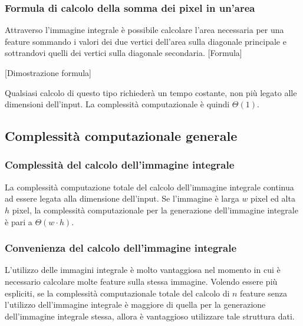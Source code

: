             \subsubsection{Formula di calcolo della somma dei pixel in un'area}
                Attraverso l'immagine integrale è possibile calcolare l'area necessaria per una feature sommando i valori dei due vertici dell'area sulla diagonale principale e sottrandovi quelli dei vertici sulla diagonale secondaria.
                [Formula]

                [Dimostrazione formula]

                Qualsiasi calcolo di questo tipo richiederà un tempo costante, non più legato alle dimensioni dell'input.
                La complessità computazionale è quindi $\Theta(1)$.

        \subsection{Complessità computazionale generale}
            \subsubsection{Complessità del calcolo dell'immagine integrale}
            La complessità computazione totale del calcolo dell'immagine integrale continua ad essere legata alla dimensione dell'input.
            Se l'immagine è larga $w$ pixel ed alta $h$ pixel, la complessità computazionale per la generazione dell'immagine integrale è pari a $\Theta(w \cdot h)$.

            \subsubsection{Convenienza del calcolo dell'immagine integrale}
            L'utilizzo delle immagini integrale è molto vantaggiosa nel momento in cui è necessario calcolare molte feature sulla stessa immagine.
            Volendo essere più espliciti, se la complessità computazionale totale del calcolo di $n$ feature senza l'utilizzo dell'immagine integrale è maggiore di quella per la generazione dell'immagine integrale stessa, allora è vantaggioso utilizzare tale struttura dati.

